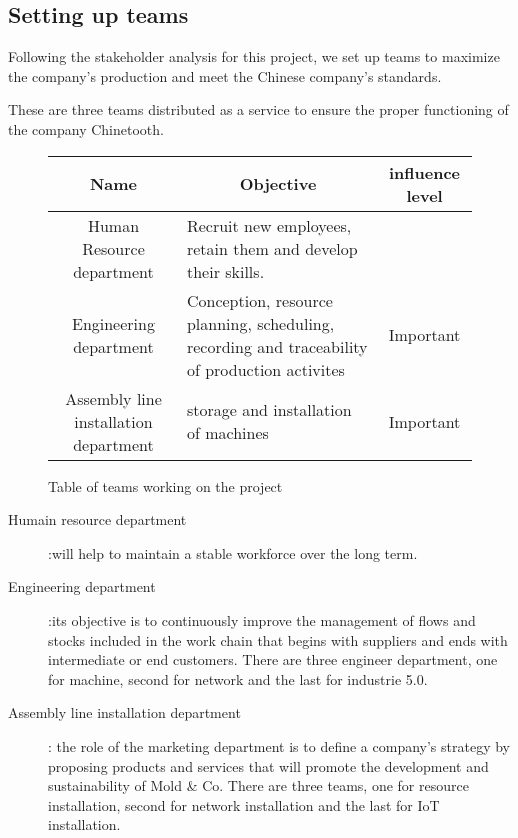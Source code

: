 \subsection{Setting up teams}

Following the stakeholder analysis for this project, we set up teams to maximize the company's production and meet the Chinese company's standards.

These are three teams distributed as a service to ensure the proper functioning of the company Chinetooth.

\begin{figure}[h]
\centering
\begin{tabular}{| c | p{6cm} | c |}
    \hline
    \rowcolor{heading-color}Name & \multicolumn{1}{c|}{Objective} & influence level \\
    \hline
    Human Resource department & Recruit new employees, retain them and develop their skills. & \\
    \hline
    Engineering department & Conception, resource planning, scheduling, recording and traceability of production activites & Important \\
    \hline 
    Assembly line installation department & storage and installation of machines & Important \\
    \hline 
\end{tabular}
\caption{Table of teams working on the project}
\end{figure}

\begin{description}
    \item[Humain resource department]:will help to maintain a stable workforce over the long term.
    \item[Engineering department]:its objective is to continuously improve the management of flows and stocks included in the work chain that begins with suppliers and ends with intermediate or end customers. There are three engineer department, one for machine, second for network and the last for industrie 5.0.
    \item[Assembly line installation department]: the role of the marketing department is to define a company's strategy by proposing products and services that will promote the development and sustainability of Mold \& Co. There are three teams, one for resource installation, second for network installation and the last for IoT installation.
\end{description} 
